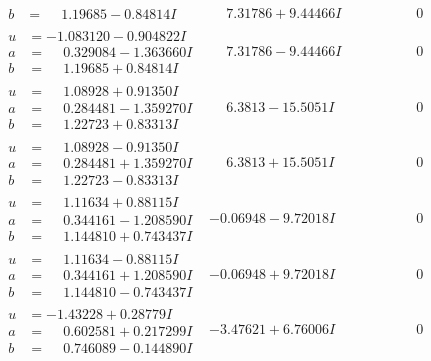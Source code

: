 \documentclass[1p]{elsarticle_modified}
\theoremstyle{definition}
\begin{document}
$$\begin{array}{c|c|c}
\begin{aligned}
b &= \phantom{-}1.19685 - 0.84814 I\end{aligned}
 & \phantom{-}7.31786 + 9.44466 I & \phantom{-0.000000 } 0 \\ \hline\begin{aligned}
u &= -1.083120 - 0.904822 I \\
a &= \phantom{-}0.329084 - 1.363660 I \\
b &= \phantom{-}1.19685 + 0.84814 I\end{aligned}
 & \phantom{-}7.31786 - 9.44466 I & \phantom{-0.000000 } 0 \\ \hline\begin{aligned}
u &= \phantom{-}1.08928 + 0.91350 I \\
a &= \phantom{-}0.284481 - 1.359270 I \\
b &= \phantom{-}1.22723 + 0.83313 I\end{aligned}
 & \phantom{-}6.3813 - 15.5051 I & \phantom{-0.000000 } 0 \\ \hline\begin{aligned}
u &= \phantom{-}1.08928 - 0.91350 I \\
a &= \phantom{-}0.284481 + 1.359270 I \\
b &= \phantom{-}1.22723 - 0.83313 I\end{aligned}
 & \phantom{-}6.3813 + 15.5051 I & \phantom{-0.000000 } 0 \\ \hline\begin{aligned}
u &= \phantom{-}1.11634 + 0.88115 I \\
a &= \phantom{-}0.344161 - 1.208590 I \\
b &= \phantom{-}1.144810 + 0.743437 I\end{aligned}
 & -0.06948 - 9.72018 I & \phantom{-0.000000 } 0 \\ \hline\begin{aligned}
u &= \phantom{-}1.11634 - 0.88115 I \\
a &= \phantom{-}0.344161 + 1.208590 I \\
b &= \phantom{-}1.144810 - 0.743437 I\end{aligned}
 & -0.06948 + 9.72018 I & \phantom{-0.000000 } 0 \\ \hline\begin{aligned}
u &= -1.43228 + 0.28779 I \\
a &= \phantom{-}0.602581 + 0.217299 I \\
b &= \phantom{-}0.746089 - 0.144890 I\end{aligned}
 & -3.47621 + 6.76006 I & \phantom{-0.000000 } 0\\

\end{array}$$
\end{document}
